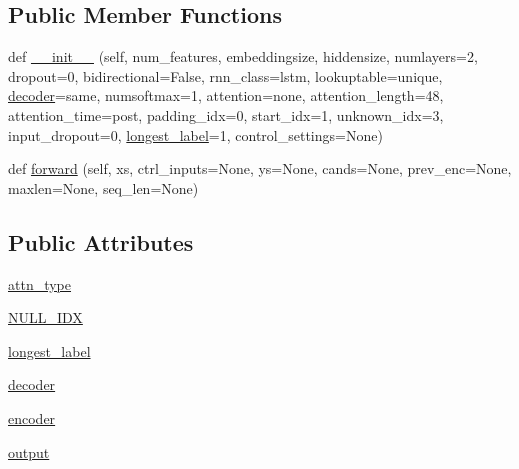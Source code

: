 \subsection*{Public Member Functions}
\begin{DoxyCompactItemize}
\item 
def \hyperlink{classprojects_1_1controllable__dialogue_1_1controllable__seq2seq_1_1modules_1_1Seq2seq_a0e66f043a16de22a410bb259eb5b32e9}{\+\_\+\+\_\+init\+\_\+\+\_\+} (self, num\+\_\+features, embeddingsize, hiddensize, numlayers=2, dropout=0, bidirectional=False, rnn\+\_\+class=\textquotesingle{}lstm\textquotesingle{}, lookuptable=\textquotesingle{}unique\textquotesingle{}, \hyperlink{classprojects_1_1controllable__dialogue_1_1controllable__seq2seq_1_1modules_1_1Seq2seq_a1616e81e3f2bb4d15b93b15413514c4d}{decoder}=\textquotesingle{}same\textquotesingle{}, numsoftmax=1, attention=\textquotesingle{}none\textquotesingle{}, attention\+\_\+length=48, attention\+\_\+time=\textquotesingle{}post\textquotesingle{}, padding\+\_\+idx=0, start\+\_\+idx=1, unknown\+\_\+idx=3, input\+\_\+dropout=0, \hyperlink{classprojects_1_1controllable__dialogue_1_1controllable__seq2seq_1_1modules_1_1Seq2seq_acf4fe4d88487eda000b3ea58914f6ed0}{longest\+\_\+label}=1, control\+\_\+settings=None)
\item 
def \hyperlink{classprojects_1_1controllable__dialogue_1_1controllable__seq2seq_1_1modules_1_1Seq2seq_a452fc75535dd204f4f4eec66962c9326}{forward} (self, xs, ctrl\+\_\+inputs=None, ys=None, cands=None, prev\+\_\+enc=None, maxlen=None, seq\+\_\+len=None)
\end{DoxyCompactItemize}
\subsection*{Public Attributes}
\begin{DoxyCompactItemize}
\item 
\hyperlink{classprojects_1_1controllable__dialogue_1_1controllable__seq2seq_1_1modules_1_1Seq2seq_a4833c08e2b56ae9b0d3f331967b01187}{attn\+\_\+type}
\item 
\hyperlink{classprojects_1_1controllable__dialogue_1_1controllable__seq2seq_1_1modules_1_1Seq2seq_abd9b0c83b9b5423909cbd67debb05fd4}{N\+U\+L\+L\+\_\+\+I\+DX}
\item 
\hyperlink{classprojects_1_1controllable__dialogue_1_1controllable__seq2seq_1_1modules_1_1Seq2seq_acf4fe4d88487eda000b3ea58914f6ed0}{longest\+\_\+label}
\item 
\hyperlink{classprojects_1_1controllable__dialogue_1_1controllable__seq2seq_1_1modules_1_1Seq2seq_a1616e81e3f2bb4d15b93b15413514c4d}{decoder}
\item 
\hyperlink{classprojects_1_1controllable__dialogue_1_1controllable__seq2seq_1_1modules_1_1Seq2seq_aacafb2797906652e350e93b50afed57c}{encoder}
\item 
\hyperlink{classprojects_1_1controllable__dialogue_1_1controllable__seq2seq_1_1modules_1_1Seq2seq_a35e1acd3fc9805a53894571a3fbcad63}{output}
\end{DoxyCompactItemize}
